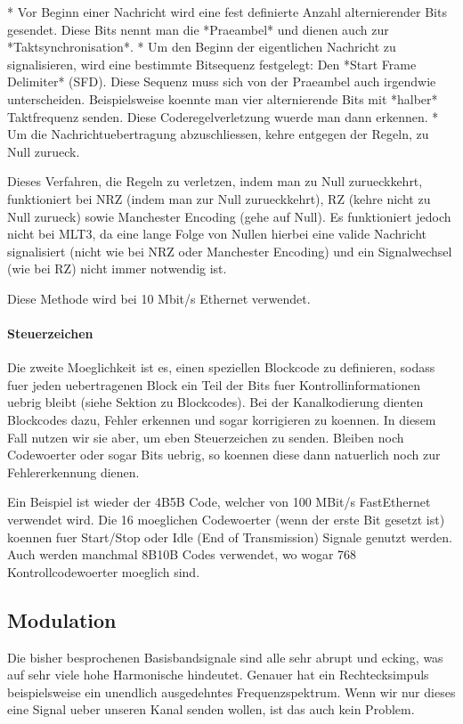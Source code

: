 * Vor Beginn einer Nachricht wird eine fest definierte Anzahl alternierender
  Bits gesendet. Diese Bits nennt man die *Praeambel* und dienen auch zur
  *Taktsynchronisation*.
* Um den Beginn der eigentlichen Nachricht zu signalisieren, wird eine bestimmte Bitsequenz festgelegt: Den *Start Frame Delimiter* (SFD). Diese Sequenz muss sich von der Praeambel auch irgendwie unterscheiden. Beispielsweise koennte man vier alternierende Bits mit *halber* Taktfrequenz senden. Diese Coderegelverletzung wuerde man dann erkennen.
* Um die Nachrichtuebertragung abzuschliessen, kehre entgegen der Regeln, zu
  Null zurueck.

Dieses Verfahren, die Regeln zu verletzen, indem man zu Null zurueckkehrt, funktioniert bei NRZ (indem man zur Null zurueckkehrt), RZ (kehre nicht zu Null zurueck) sowie Manchester Encoding (gehe auf Null). Es funktioniert jedoch nicht bei MLT3, da eine lange Folge von Nullen hierbei eine valide Nachricht signalisiert (nicht wie bei NRZ oder Manchester Encoding) und ein Signalwechsel (wie bei RZ) nicht immer notwendig ist.

Diese Methode wird bei 10 Mbit/s Ethernet verwendet.

\paragraph{ Steuerzeichen}

Die zweite Moeglichkeit ist es, einen speziellen Blockcode zu definieren, sodass fuer jeden uebertragenen Block ein Teil der Bits fuer Kontrollinformationen uebrig bleibt (siehe Sektion zu Blockcodes). Bei der Kanalkodierung dienten Blockcodes dazu, Fehler erkennen und sogar korrigieren zu koennen. In diesem Fall nutzen wir sie aber, um eben Steuerzeichen zu senden. Bleiben noch Codewoerter oder sogar Bits uebrig, so koennen diese dann natuerlich noch zur Fehlererkennung dienen.

Ein Beispiel ist wieder der 4B5B Code, welcher von 100 MBit/s FastEthernet verwendet wird. Die 16 moeglichen Codewoerter (wenn der erste Bit gesetzt ist) koennen fuer Start/Stop oder Idle (End of Transmission) Signale genutzt werden. Auch werden manchmal 8B10B Codes verwendet, wo wogar 768 Kontrollcodewoerter moeglich sind.

\subsection{ Modulation}

Die bisher besprochenen Basisbandsignale sind alle sehr abrupt und ecking, was
auf sehr viele hohe Harmonische hindeutet. Genauer hat ein Rechtecksimpuls
beispielsweise ein unendlich ausgedehntes Frequenzspektrum. Wenn wir nur dieses
eine Signal ueber unseren Kanal senden wollen, ist das auch kein Problem.

